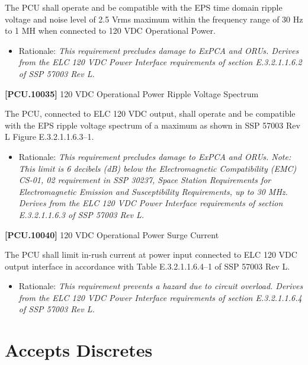 \documentclass[12pt,oneside,oldfontcommands]{memoir}
\begin{document}
The \gls{PCU} shall operate and be compatible with the EPS time domain ripple voltage and noise level of 2.5 Vrms maximum within the frequency range of 30 Hz to 1 MH when connected to 120 \gls{VDC} Operational Power.

\begin{itemize}
\item{} Rationale: \emph{This requirement precludes damage to ExPCA and ORUs. Derives from the ELC 120 VDC Power Interface requirements of section E.3.2.1.1.6.2 of SSP 57003 Rev L.}

\end{itemize}

\textbf{[PCU.10035]} 120 \gls{VDC} Operational Power Ripple Voltage Spectrum

The \gls{PCU}, connected to \gls{ELC} 120 \gls{VDC} output, shall operate and be compatible with the EPS ripple voltage spectrum of a maximum as shown in SSP 57003 Rev L Figure E.3.2.1.1.6.3--1.

\begin{itemize}
\item{} Rationale: \emph{This requirement precludes damage to ExPCA and ORUs. Note: This limit is 6 decibels (dB) below the Electromagnetic Compatibility (EMC) CS-01, 02 requirement in SSP 30237, Space Station Requirements for Electromagnetic Emission and Susceptibility Requirements, up to 30 MHz. Derives from the ELC 120 VDC Power Interface requirements of section E.3.2.1.1.6.3 of SSP 57003 Rev L.}

\end{itemize}

\textbf{[PCU.10040]} 120 \gls{VDC} Operational Power Surge Current

The \gls{PCU} shall limit in-rush current at power input connected to \gls{ELC} 120 \gls{VDC} output interface in accordance with Table E.3.2.1.1.6.4--1 of SSP 57003 Rev L.

\begin{itemize}
\item{} Rationale: \emph{This requirement prevents a hazard due to circuit overload. Derives from the ELC 120 VDC Power Interface requirements of section E.3.2.1.1.6.4 of SSP 57003 Rev L.}

\end{itemize}

\section{Accepts Discretes}
\label{acceptsdiscretes}
\end{document}
